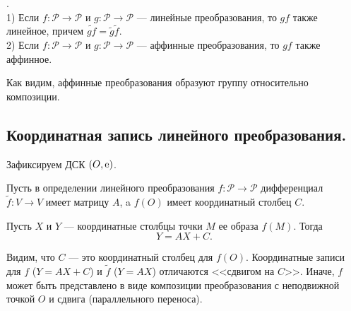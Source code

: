 \begin{predl}\label{p4_2_5}.\\
1) Если $f: \mathcal{P} \to \mathcal{P}$ и $g: \mathcal{P} \to \mathcal{P}$
--- линейные преобразования, то $gf$ также линейное, причем
$\widetilde{gf} = \widetilde{g}\widetilde{f}$.\\
2) Если $f: \mathcal{P} \to \mathcal{P}$ и $g: \mathcal{P} \to \mathcal{P}$
--- аффинные преобразования, то $gf$ также аффинное.
\end{predl}

\otstup

Как видим,  аффинные  преобразования образуют группу относительно композиции.




\subsection{Координатная запись линейного преобразования.}

Зафиксируем ДСК $(O, \mathrm{e})$.

Пусть в определении линейного преобразования $f : \mathcal{P} \to \mathcal{P}$
дифференциал $\widetilde{f} : V\to V$ имеет матрицу
$A$, a $f(O)$ имеет координатный столбец
$C$. 



\begin{predl}\label{p4_2_555}
Пусть $X$ и $Y$ --- координатные столбцы точки $M$  ее образа $f(M)$. Тогда
\begin{equation}
\boxed{Y=AX+C}.
\end{equation}
\end{predl}

Видим, что $C$ --- это координатный столбец для $f(O)$.
Координатные записи для $f$ ($Y=AX+C$) и $\widetilde{f}$ 
($Y=AX$) отличаются <<сдвигом на $C$>>.
Иначе, $f$ может быть представлено в виде композиции 
преобразования с неподвижной точкой $O$ и сдвига (параллельного переноса).



%




